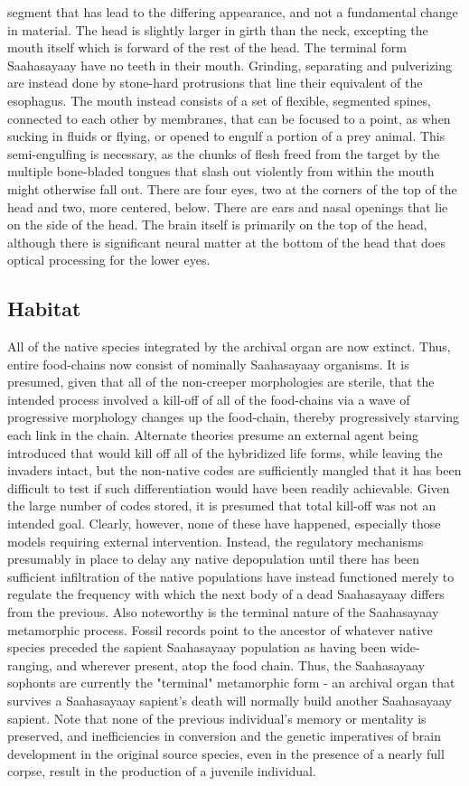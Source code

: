 segment that has lead to the differing appearance, and not a
fundamental change in material. The head is slightly larger in girth
than the neck, excepting the mouth itself which is forward of the rest
of the head. The terminal form Saahasayaay have no teeth in their
mouth. Grinding, separating and pulverizing are instead done by
stone-hard protrusions that line their equivalent of the
esophagus. The mouth instead consists of a set of flexible, segmented
spines, connected to each other by membranes, that can be focused to a
point, as when sucking in fluids or flying, or opened to engulf a
portion of a prey animal. This semi-engulfing is necessary, as the
chunks of flesh freed from the target by the multiple bone-bladed
tongues that slash out violently from within the mouth might otherwise
fall out. There are four eyes, two at the corners of the top of the
head and two, more centered, below. There are ears and nasal openings
that lie on the side of the head. The brain itself is primarily on the
top of the head, although there is significant neural matter at the
bottom of the head that does optical processing for the lower eyes.


\subsection{Habitat}
All of the native species integrated by the archival organ are now
extinct. Thus, entire food-chains now consist of nominally Saahasayaay
organisms. It is presumed, given that all of the non-creeper
morphologies are sterile, that the intended process involved a
kill-off of all of the food-chains via a wave of progressive
morphology changes up the food-chain, thereby progressively starving
each link in the chain. Alternate theories presume an external agent
being introduced that would kill off all of the hybridized life forms,
while leaving the invaders intact, but the non-native codes are
sufficiently mangled that it has been difficult to test if such
differentiation would have been readily achievable. Given the large
number of codes stored, it is presumed that total kill-off was not an
intended goal. Clearly, however, none of these have happened,
especially those models requiring external intervention. Instead, the
regulatory mechanisms presumably in place to delay any native
depopulation until there has been sufficient infiltration of the
native populations have instead functioned merely to regulate the
frequency with which the next body of a dead Saahasayaay differs from
the previous. Also noteworthy is the terminal nature of the
Saahasayaay metamorphic process. Fossil records point to the ancestor
of whatever native species preceded the sapient Saahasayaay population
as having been wide-ranging, and wherever present, atop the food
chain. Thus, the Saahasayaay sophonts are currently the "terminal"
metamorphic form - an archival organ that survives a Saahasayaay
sapient's death will normally build another Saahasayaay sapient. Note
that none of the previous individual's memory or mentality is
preserved, and inefficiencies in conversion and the genetic
imperatives of brain development in the original source species, even
in the presence of a nearly full corpse, result in the production of a
juvenile individual.


